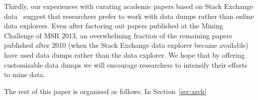Thirdly, our experiences with curating academic papers based on Stack Exchange data~\cite{vasilescu2012meta} 
suggest that researchers prefer to work with data dumps rather than online data explorers.
Even after factoring out papers published at the Mining Challenge of MSR 2013, an overwhelming 
fraction of the remaining papers published after 2010 (when the Stack Exchange data explorer became available) 
have used data dumps rather than the data explorer.
We hope that by offering customisable \ght data dumps we will encourage researchers to intensify their efforts
to mine \gh data.

The rest of this paper is organised as follows.
In Section~\ref{sec:arch} 

